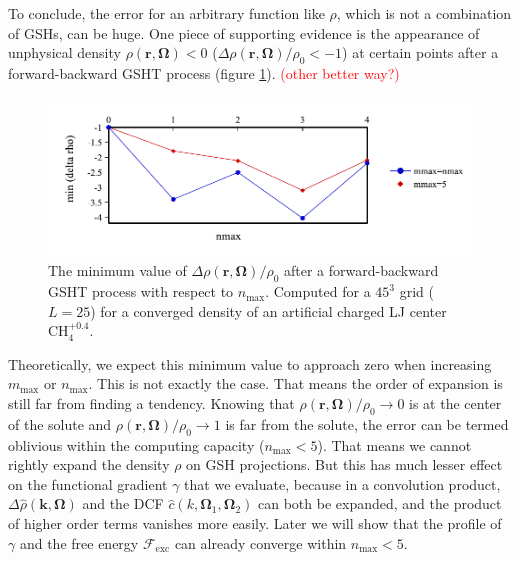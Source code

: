 To conclude, the error for an arbitrary function like $\rho$,
which is not a combination of \acs{GSH}s, can be huge. One piece of supporting evidence
is the appearance of unphysical density $\rho(\mathbf{r},\mathbf{\Omega})<0$
($\Delta\rho(\mathbf{r},\mathbf{\Omega})/\rho_{0}<-1$) at certain
points after a forward-backward \acs{GSHT} process (figure \ref{fig:unphysical-rho}).
\textcolor{red}{(other better way?)}

\begin{figure}[h]
\begin{centering}
\includegraphics[bb=0bp 10bp 454bp 160bp,width=0.75\columnwidth]{_figure/results/min_delta_rho}
\par\end{centering}
\caption[The minimum value of $\Delta\rho(\mathbf{r},\mathbf{\Omega})/\rho_{0}$
after a forward-backward \acs{GSHT} process]{The minimum value of $\Delta\rho(\mathbf{r},\mathbf{\Omega})/\rho_{0}$
after a forward-backward \acs{GSHT} process with respect to $n_{\max}$.
Computed for a $45^{3}$ grid ($L=25$) for a converged density of
an artificial charged LJ center $\mathrm{CH}_{4}^{+0.4}$. \label{fig:unphysical-rho} }
\end{figure}

Theoretically, we expect this minimum value to approach zero when
increasing $m_{\max}$ or $n_{\max}$. This is not exactly the case.
That means the order of expansion is still far from finding
a tendency. Knowing that $\rho(\mathbf{r},\mathbf{\Omega})/\rho_{0}\rightarrow0$
is at the center of the solute and $\rho(\mathbf{r},\mathbf{\Omega})/\rho_{0}\rightarrow1$
is far from the solute, the error can be termed oblivious within the computing %
capacity ($n_{\max}<5$). That means we cannot rightly expand the
density $\rho$ on \acs{GSH} projections. But this has
much lesser effect on the functional gradient $\gamma$ that we evaluate,
because in a convolution product, $\Delta\hat{\rho}(\mathbf{k},\mathbf{\Omega})$
and the \acs{DCF} $\hat{c}(k,\mathbf{\Omega}_{1},\mathbf{\Omega}_{2})$
can both be expanded, and the product of higher order terms vanishes more %
easily. Later we will show that the profile of $\gamma$ and the
free energy $\mathcal{F}_{\mathrm{exc}}$ can already converge within
$n_{\max}<5$.

